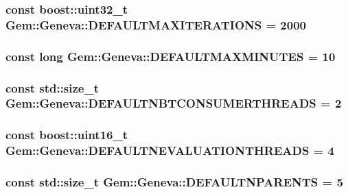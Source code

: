 \label{db/de9/namespaceGem_1_1Geneva_a06037b35202b3efd9e20000d566bd790}
\hypertarget{namespaceGem_1_1Geneva_a71dd5f6f26fa4f040b16cc729074f219}{
\subsubsection[{DEFAULTMAXITERATIONS}]{\setlength{\rightskip}{0pt plus 5cm}const boost::uint32\_\-t {\bf Gem::Geneva::DEFAULTMAXITERATIONS} = 2000}}
\label{db/de9/namespaceGem_1_1Geneva_a71dd5f6f26fa4f040b16cc729074f219}
\hypertarget{namespaceGem_1_1Geneva_a84c4227f18d85106f2377e8f5cbddf4d}{
\subsubsection[{DEFAULTMAXMINUTES}]{\setlength{\rightskip}{0pt plus 5cm}const long {\bf Gem::Geneva::DEFAULTMAXMINUTES} = 10}}
\label{db/de9/namespaceGem_1_1Geneva_a84c4227f18d85106f2377e8f5cbddf4d}
\hypertarget{namespaceGem_1_1Geneva_ac381bed98f84863017b49a4c155199fe}{
\subsubsection[{DEFAULTNBTCONSUMERTHREADS}]{\setlength{\rightskip}{0pt plus 5cm}const std::size\_\-t {\bf Gem::Geneva::DEFAULTNBTCONSUMERTHREADS} = 2}}
\label{db/de9/namespaceGem_1_1Geneva_ac381bed98f84863017b49a4c155199fe}
\hypertarget{namespaceGem_1_1Geneva_a86f3fe2eb8311d0a9b5c18a32c8ee4f1}{
\subsubsection[{DEFAULTNEVALUATIONTHREADS}]{\setlength{\rightskip}{0pt plus 5cm}const boost::uint16\_\-t {\bf Gem::Geneva::DEFAULTNEVALUATIONTHREADS} = 4}}
\label{db/de9/namespaceGem_1_1Geneva_a86f3fe2eb8311d0a9b5c18a32c8ee4f1}
\hypertarget{namespaceGem_1_1Geneva_a7ba466fb273415c31b26532094f2dd51}{
\subsubsection[{DEFAULTNPARENTS}]{\setlength{\rightskip}{0pt plus 5cm}const std::size\_\-t {\bf Gem::Geneva::DEFAULTNPARENTS} = 5}}
